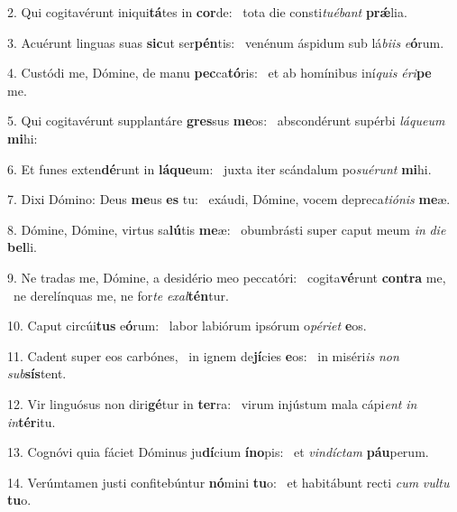 2. Qui cogitavérunt iniqui\textbf{tá}tes in \textbf{cor}de: \ast\  tota die consti\textit{tu}\textit{é}\textit{bant} \textbf{prǽ}lia.\

3. Acuérunt linguas suas \textbf{sic}ut ser\textbf{pén}tis: \ast\  venénum áspidum sub lá\textit{bi}\textit{is} \textit{e}\textbf{ó}rum.\

4. Custódi me, Dómine, de manu \textbf{pec}ca\textbf{tó}ris: \ast\  et ab homínibus iní\textit{quis} \textit{é}\textit{ri}\textbf{pe} me.\

5. Qui cogitavérunt supplantáre \textbf{gres}sus \textbf{me}os: \ast\  abscondérunt supérbi \textit{lá}\textit{que}\textit{um} \textbf{mi}hi:\

6. Et funes exten\textbf{dé}runt in \textbf{lá}\textbf{que}um: \ast\  juxta iter scándalum po\textit{su}\textit{é}\textit{runt} \textbf{mi}hi.\

7. Dixi Dómino: Deus \textbf{me}us \textbf{es} tu: \ast\  exáudi, Dómine, vocem depreca\textit{ti}\textit{ó}\textit{nis} \textbf{me}æ.\

8. Dómine, Dómine, virtus sa\textbf{lú}tis \textbf{me}æ: \ast\  obumbrásti super caput meum \textit{in} \textit{di}\textit{e} \textbf{bel}li.\

9. Ne tradas me, Dómine, a desidério meo peccatóri: \dag\  cogita\textbf{vé}runt \textbf{con}\textbf{tra} me, \ast\  ne derelínquas me, ne for\textit{te} \textit{ex}\textit{al}\textbf{tén}tur.\

10. Caput circúi\textbf{tus} e\textbf{ó}rum: \ast\  labor labiórum ipsórum o\textit{pé}\textit{ri}\textit{et} \textbf{e}os.\

11. Cadent super eos carbónes, \dag\  in ignem de\textbf{jí}cies \textbf{e}os: \ast\  in miséri\textit{is} \textit{non} \textit{sub}\textbf{sís}tent.\

12. Vir linguósus non diri\textbf{gé}tur in \textbf{ter}ra: \ast\  virum injústum mala cápi\textit{ent} \textit{in} \textit{in}\textbf{tér}itu.\

13. Cognóvi quia fáciet Dóminus ju\textbf{dí}cium \textbf{ín}\textbf{o}pis: \ast\  et \textit{vin}\textit{díc}\textit{tam} \textbf{páu}perum.\

14. Verúmtamen justi confitebúntur \textbf{nó}mini \textbf{tu}o: \ast\  et habitábunt recti \textit{cum} \textit{vul}\textit{tu} \textbf{tu}o.\

